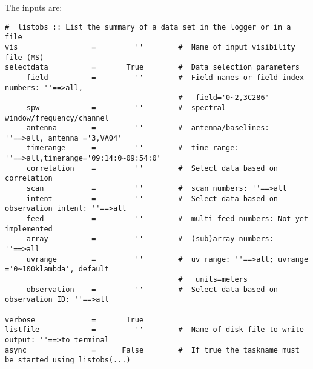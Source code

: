 The inputs are:
\small
\begin{verbatim}
#  listobs :: List the summary of a data set in the logger or in a file
vis                 =         ''        #  Name of input visibility file (MS)
selectdata          =       True        #  Data selection parameters
     field          =         ''        #  Field names or field index numbers: ''==>all,
                                        #   field='0~2,3C286'
     spw            =         ''        #  spectral-window/frequency/channel
     antenna        =         ''        #  antenna/baselines: ''==>all, antenna ='3,VA04'
     timerange      =         ''        #  time range: ''==>all,timerange='09:14:0~09:54:0'
     correlation    =         ''        #  Select data based on correlation
     scan           =         ''        #  scan numbers: ''==>all
     intent         =         ''        #  Select data based on observation intent: ''==>all
     feed           =         ''        #  multi-feed numbers: Not yet implemented
     array          =         ''        #  (sub)array numbers: ''==>all
     uvrange        =         ''        #  uv range: ''==>all; uvrange ='0~100klambda', default
                                        #   units=meters
     observation    =         ''        #  Select data based on observation ID: ''==>all

verbose             =       True        
listfile            =         ''        #  Name of disk file to write output: ''==>to terminal
async               =      False        #  If true the taskname must be started using listobs(...)

\end{verbatim}
\normalsize

